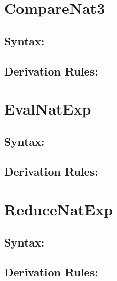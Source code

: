 \documentclass[11pt]{jarticle}
\begin{document}
\newpage

\section*{CompareNat3}



\subsection*{Syntax:}

\CompareNatiiiDisplayBNF

\subsection*{Derivation Rules:}
\CompareNatiiiDisplayRules

\newpage

\section*{EvalNatExp}



\subsection*{Syntax:}

\EvalNatExpDisplayBNF

\subsection*{Derivation Rules:}
\EvalNatExpDisplayRules

\newpage

\section*{ReduceNatExp}



\subsection*{Syntax:}

\ReduceNatExpDisplayBNF

\subsection*{Derivation Rules:}
\ReduceNatExpDisplayRules
\end{document}
